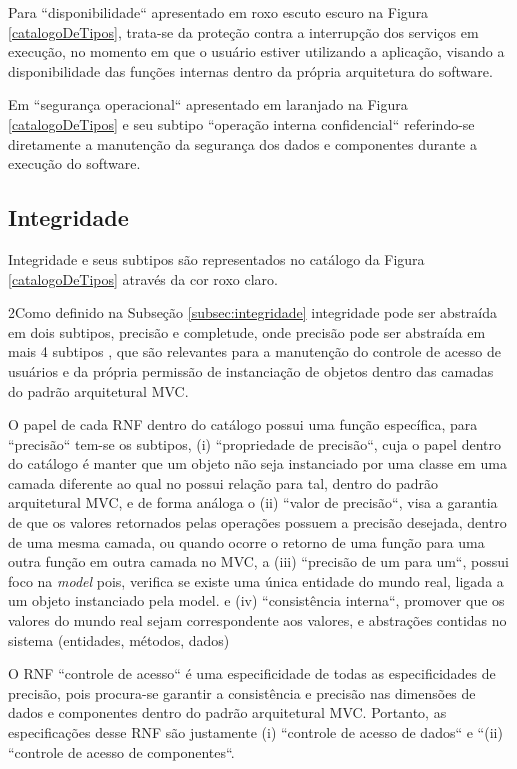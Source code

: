 Para ``disponibilidade`` apresentado em roxo escuto escuro na Figura \ref{catalogoDeTipos}, trata-se da proteção contra a interrupção dos serviços em execução, no momento em que o usuário estiver utilizando a aplicação, visando a disponibilidade das funções internas dentro da própria arquitetura do software. 

Em ``segurança operacional`` apresentado em laranjado na Figura \ref{catalogoDeTipos} e seu subtipo ``operação interna confidencial`` referindo-se diretamente a manutenção da segurança dos dados e componentes durante a execução do software. 

\subsection{Integridade}

Integridade e seus subtipos são representados no catálogo da Figura \ref{catalogoDeTipos} através da cor roxo claro. 

2Como definido na Subseção \ref{subsec:integridade} integridade pode ser abstraída em dois subtipos, precisão e completude, onde precisão pode ser abstraída em mais 4 subtipos \cite{chung2012non}, que são relevantes para a manutenção do controle de acesso de usuários e da própria permissão de instanciação de objetos dentro das camadas do padrão arquitetural MVC. 

O papel de cada RNF dentro do catálogo possui uma função específica, para ``precisão`` tem-se os subtipos, (i) ``propriedade de precisão``, cuja o papel dentro do catálogo é manter que um objeto não seja instanciado por uma classe em uma camada diferente ao qual no possui relação para tal, dentro do padrão arquitetural MVC, e de forma análoga o (ii) ``valor de precisão``, visa a garantia de que os valores retornados pelas operações possuem a precisão desejada, dentro de uma mesma camada, ou quando ocorre o retorno de uma função para uma outra função em outra camada no MVC, a (iii) ``precisão de um para um``, possui foco na \textit{model} pois, verifica se existe uma única entidade do mundo real, ligada a um objeto instanciado pela model. e (iv) ``consistência interna``, promover que os valores do mundo real sejam correspondente aos valores, e abstrações contidas no sistema (entidades, métodos, dados)

O RNF ``controle de acesso`` é uma especificidade de todas as especificidades de precisão, pois procura-se garantir a consistência e precisão nas dimensões de dados e componentes dentro do padrão arquitetural MVC. Portanto, as especificações desse RNF são justamente (i) ``controle de acesso de dados`` e ``(ii) ``controle de acesso de componentes``.

